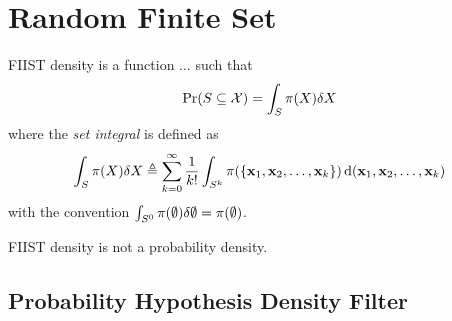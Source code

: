 \documentclass[
	a4paper,
	footheight=38pt
]{scrreprt}
\begin{document}
\chapter{Random Finite Set}

FIIST density is a function ... such that 
\begin{equation}\label{eq:fiist_density}
	\mathrm{Pr}(S \subseteq \mathcal{X}) = \int_S \pi(X) \dsx[X]
\end{equation}
where the \emph{set integral} is defined as
\begin{equation}\label{eq:set_integral}
	\int_S \pi(X) \dsx[X] \triangleq \sum_{k=0}^{\infty}\frac{1}{k!}\int_{S^k} \pi(\Bqty{\inVar_1, \inVar_2, \ldots, \inVar_k}) \dx[(\inVar_1, \inVar_2, \ldots, \inVar_k)]
\end{equation}
with the convention \( \int_{S^0} \pi(\emptyset) \dsx[\emptyset] = \pi(\emptyset) \).

FIIST density is not a probability density.

\section{Probability Hypothesis Density Filter}
\end{document}
